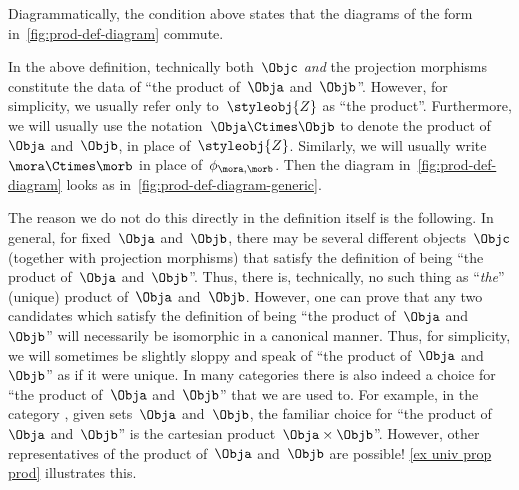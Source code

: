 \begin{marginfigure}
  \centering
  \caption{}
  \label{fig:prod-def-diagram}
\end{marginfigure}
\begin{remark}\label{re:prod-comm-diag}
  Diagrammatically, the condition above states that the diagrams of the form
  in~\cref{fig:prod-def-diagram} commute.
\end{remark}

\begin{marginfigure}
  \begin{center}
\end{center}
    \caption{\label{fig:prod-def-diagram-generic}}
  \end{marginfigure}

\begin{remark}
  \label{prod unique up to iso}
  In the above definition, technically both~$\Objc$ \emph{and} the projection morphisms constitute the data of ``the product of~$\Obja$ and~$\Objb$''.
  However, for simplicity, we usually refer only to~$\styleobj{Z}$ as ``the product''.
  Furthermore, we will usually use the notation~$\Obja \Ctimes \Objb$ to denote the product of~$\Obja$ and~$\Objb$, in place of~$\styleobj{Z}$.
  Similarly, we will usually write~$\mora \Ctimes \morb$ in place of~$\phi_{\mora, \morb}$. Then the diagram in~\cref{fig:prod-def-diagram} looks as in~\cref{fig:prod-def-diagram-generic}.
  
The reason we do not do this directly in the definition itself is the following.
In general, for fixed~$\Obja$ and~$\Objb$, there may be several different objects~$\Objc$ (together with projection morphisms) that satisfy the definition of being ``the product of~$\Obja$ and~$\Objb$''.
  Thus, there is, technically, no such thing as ``\emph{the}'' (unique) product of~$\Obja$ and~$\Objb$.
  However, one can prove that any two candidates which satisfy the definition of being ``the product of~$\Obja$ and~$\Objb$'' will necessarily be isomorphic in a canonical manner.
  Thus, for simplicity, we will sometimes be slightly sloppy and speak of ``the product of~$\Obja$ and~$\Objb$'' as if it were unique.
  In many categories there is also indeed a choice for ``the product of~$\Obja$ and~$\Objb$'' that we are used to.
  For example, in the category \Set, given sets~$\Obja$ and~$\Objb$, the familiar choice for ``the product of~$\Obja$ and~$\Objb$'' is the cartesian product~$\Obja \times \Objb$''.
  However, other representatives of the product of~$\Obja$ and~$\Objb$ are possible! \cref{ex univ prop prod} illustrates this.
\end{remark}

